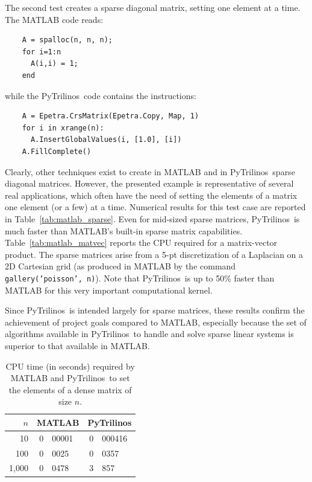 \documentclass[acmtocl]{acmtrans2m}
\newcommand{\PyTrilinos}{{PyTrilinos}}
\begin{document}
The second test creates a sparse diagonal matrix, setting one element
at a time.  The MATLAB code reads:
\begin{verbatim}
    A = spalloc(n, n, n);
    for i=1:n
      A(i,i) = 1;
    end
\end{verbatim}
while the \PyTrilinos\ code contains the instructions:
\begin{verbatim}
    A = Epetra.CrsMatrix(Epetra.Copy, Map, 1)
    for i in xrange(n):
      A.InsertGlobalValues(i, [1.0], [i])
    A.FillComplete()
\end{verbatim}
Clearly, other techniques exist to create in MATLAB and in
\PyTrilinos\ sparse diagonal matrices.  However, the presented example
is representative of several real applications, which often have the
need of setting the elements of a matrix one element (or a few) at a
time.  Numerical results for this test case are reported in
Table~\ref{tab:matlab_sparse}.  Even for mid-sized sparse matrices,
\PyTrilinos\ is much faster than MATLAB's built-in sparse matrix
capabilities.  Table~\ref{tab:matlab_matvec} reports the CPU required
for a matrix-vector product.  The sparse matrices arise from a 5-pt
discretization of a Laplacian on a 2D Cartesian grid (as produced in
MATLAB by the command {\tt gallery('poisson', n)}).  Note that
\PyTrilinos\ is up to 50\% faster than MATLAB for this very important
computational kernel.

Since \PyTrilinos\ is intended largely for sparse matrices, these
results confirm the achievement of project goals compared to MATLAB,
especially because the set of algorithms available in \PyTrilinos\ to
handle and solve sparse linear systems is superior to that available
in MATLAB.

\begin{table}
  \begin{center}
    \begin{tabular}{|r|r@{.}l|r@{.}l|}
      \hline
      $n$ & \multicolumn{2}{c|}{MATLAB} &
      \multicolumn{2}{c|}{PyTrilinos} \\
      \hline
      \hline
         10  & 0&00001 & 0&000416 \\
        100  & 0&0025  & 0&0357   \\
      1,000  & 0&0478  & 3&857    \\
      \hline
    \end{tabular}
    \caption{CPU time (in seconds) required by MATLAB and
      \PyTrilinos\ to set the elements of a dense matrix of size $n$.}
    \label{tab:matlab_dense}
  \end{center}
\end{table}
\end{document}
